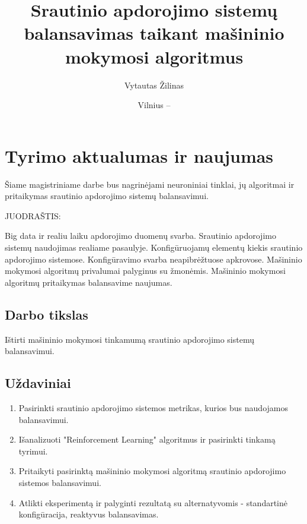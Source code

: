 \documentclass{VUMIFPSbakalaurinis}
\title{Srautinio apdorojimo sistemų balansavimas taikant mašininio mokymosi algoritmus}
\author{Vytautas Žilinas}
\date{Vilnius – \the\year}
\begin{document}
 
\maketitle

\cleardoublepage{}
\setcounter{page}{2}

\section{Tyrimo aktualumas ir naujumas}

Šiame magistriniame darbe bus nagrinėjami neuroniniai tinklai, jų algoritmai ir  pritaikymas srautinio apdorojimo sistemų balansavimui. 

JUODRAŠTIS:

Big data ir realiu laiku apdorojimo duomenų svarba.
Srautinio apdorojimo sistemų naudojimas realiame pasaulyje.
Konfigūruojamų elementų kiekis srautinio apdorojimo sistemose.
Konfigūravimo svarba neapibrėžtuose apkrovose.
Mašininio mokymosi algoritmų privalumai palyginus su žmonėmis.
Mašininio mokymosi algoritmų pritaikymas balansavime naujumas.


\subsection{Darbo tikslas}
Ištirti mašininio mokymosi tinkamumą srautinio apdorojimo sistemų balansavimui. 

\subsection{Uždaviniai}
\begin{enumerate}
    \item Pasirinkti srautinio apdorojimo sistemos metrikas, kurios bus naudojamos balansavimui.
    \item Išanalizuoti "Reinforcement Learning" algoritmus ir pasirinkti tinkamą tyrimui.
    \item Pritaikyti pasirinktą mašininio mokymosi algoritmą srautinio apdorojimo sistemos balansavimui.
    \item Atlikti eksperimentą ir palyginti rezultatą su alternatyvomis - standartinė konfigūracija, reaktyvus balansavimas. 
\end{enumerate}
\end{document}
